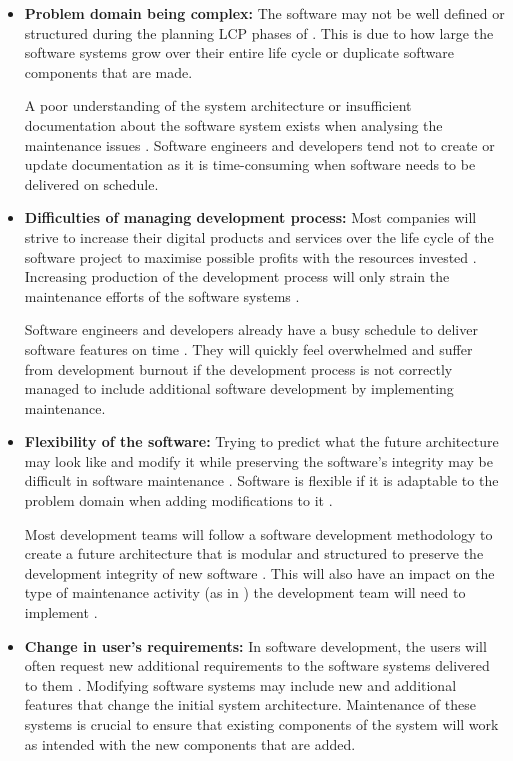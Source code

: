 \begin{itemize}
	\item \textbf{Problem domain being complex:} The software may not be well defined or structured during the planning LCP phases of . This is due to how large the software systems grow over their entire life cycle or duplicate software components that are made.\par A poor understanding of the system architecture or insufficient documentation about the software system exists when analysing the maintenance issues \cite{Galster2019}. Software engineers and developers tend not to create or update documentation as it is time-consuming when software needs to be delivered on schedule.
	\item \textbf{Difficulties of managing development process:} Most companies will strive to increase their digital products and services over the life cycle of the software project to maximise possible profits with the resources invested \cite{Niu2018}. Increasing production of the development process will only strain the maintenance efforts of the software systems \cite{Sneed2004}.\par Software engineers and developers already have a busy schedule to deliver software features on time \cite{Galster2019, Lenarduzzi2017}. They will quickly feel overwhelmed and suffer from development burnout if the development process is not correctly managed to include additional software development by implementing maintenance.
	\item \textbf{Flexibility of the software:} Trying to predict what the future architecture may look like and modify it while preserving the software's integrity may be difficult in software maintenance \cite{Garlan1999}. Software is flexible if it is adaptable to the problem domain when adding modifications to it \cite{Ogheneovo2014}.\par Most development teams will follow a software development methodology to create a future architecture that is modular and structured to preserve the development integrity of new software \cite{Vijayasarathy2016}. This will also have an impact on the type of maintenance activity (as in ) the development team will need to implement \cite{Thamburaj2017, Snipes2018}.
	\item \textbf{Change in user's requirements:} In software development, the users will often request new additional requirements to the software systems delivered to them \cite{Ogheneovo2014}. Modifying software systems may include new and additional features that change the initial system architecture. Maintenance of these systems is crucial to ensure that existing components of the system will work as intended with the new components that are added.

\end{itemize}
